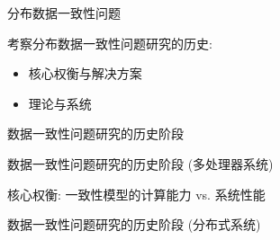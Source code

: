 %       
\begin{frame}{分布数据一致性问题}

  \pause
  \vspace{0.80cm}

  考察分布数据一致性问题研究的历史:
  \vspace{8pt}
  \begin{itemize}
	\setlength{\itemsep}{6pt}
	\item 核心权衡与解决方案 
	  \pause
	\item 理论与系统
  \end{itemize}
\end{frame}
\begin{frame}{数据一致性问题研究的历史阶段}
\end{frame}
\begin{frame}{数据一致性问题研究的历史阶段 (多处理器系统)}

  \begin{center}
	核心权衡: 一致性模型的计算能力 vs. 系统性能
  \end{center}
\end{frame}
\begin{frame}{数据一致性问题研究的历史阶段 (分布式系统)}
  \graphicspath{{tikz-in-beamer/}}
  \begin{figure}[h!]
    \centering
    \begin{adjustbox}{max totalsize = {1.00\textwidth}{1.00\textheight}, center}
	  
    \end{adjustbox}
  \end{figure}
\end{frame}
